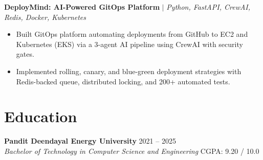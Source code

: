 \documentclass[10pt]{article}
\newcommand{\rItemList}{\begin{itemize}[leftmargin=1.1em, itemsep=0.8pt, topsep=0.8pt, parsep=0pt, label=\textbullet]}
\newcommand{\rEndItemList}{\end{itemize}}
\begin{document}
\textbf{DeployMind: AI-Powered GitOps Platform} $\vert$ \textit{Python, FastAPI, CrewAI, Redis, Docker, Kubernetes} \\
\rItemList
\item Built GitOps platform automating deployments from GitHub to EC2 and Kubernetes (EKS) via a 3-agent AI pipeline using CrewAI with security gates.
\item Implemented rolling, canary, and blue-green deployment strategies with Redis-backed queue, distributed locking, and 200+ automated tests.
\rEndItemList

\section{Education}

\textbf{Pandit Deendayal Energy University} \hfill 2021 -- 2025 \\
\textit{Bachelor of Technology in Computer Science and Engineering} \hfill CGPA: 9.20 / 10.0
\end{document}
